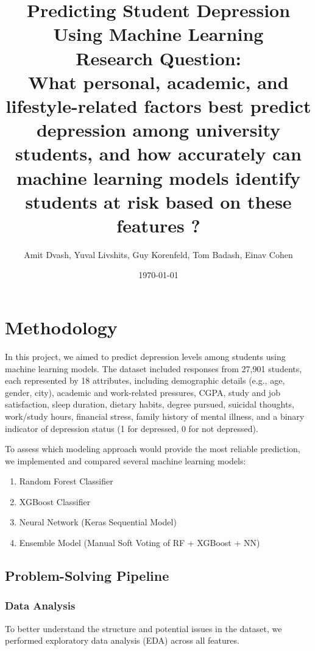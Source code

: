 \documentclass{article} %
\title{Predicting Student Depression Using Machine Learning\\ [1.2ex]
\Large Research Question: \\ [1.2ex]
\normalsize What personal, academic, and lifestyle-related factors best predict depression among university students, and how accurately can machine learning models identify students at risk based on these features ?}
\author{\small Amit Dvash, Yuval Livshits, Guy Korenfeld, Tom Badash, Einav Cohen}
\date{\small \today}
\begin{document}
\maketitle
    
\section{Methodology}

In this project, we aimed to predict depression levels among students using machine learning models. The dataset included responses from 27,901 students, each represented by 18
attributes, including demographic details (e.g., age, gender, city), academic and
work-related pressures, CGPA, study and job satisfaction, sleep duration, dietary
habits, degree pursued, suicidal thoughts, work/study hours, financial stress,
family history of mental illness, and a binary indicator of depression status (1 for
depressed, 0 for not depressed).

To assess which modeling approach would provide the most reliable prediction, we implemented and compared several machine learning models:

\begin{enumerate}
    \item Random Forest Classifier
    \item XGBoost Classifier
    \item Neural Network (Keras Sequential Model)
    \item Ensemble Model (Manual Soft Voting of RF + XGBoost + NN)
\end{enumerate}


\subsection*{Problem-Solving Pipeline}

\subsubsection*{Data Analysis}

To better understand the structure and potential issues in the dataset, we performed exploratory data analysis (EDA) across all features.
\end{document}
